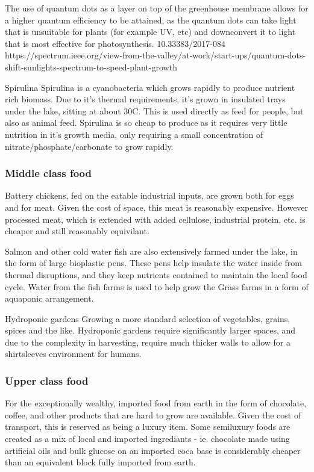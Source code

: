 \documentclass[10pt]{article}
\begin{document}
The use of quantum dots as a layer on top of the greenhouse membrane allows for a higher quantum efficiency to be attained, as the quantum dots can take light that is unsuitable for plants (for example UV, etc) and downconvert it to light that is most effective for photosynthesis. 10.33383/2017-084 
https://spectrum.ieee.org/view-from-the-valley/at-work/start-ups/quantum-dots-shift-sunlights-spectrum-to-speed-plant-growth


Spirulina
Spirulina is a cyanobacteria which grows rapidly to produce nutrient rich biomass. Due to it's thermal requirements, it's grown in insulated trays under the lake, sitting at about 30C. This is used directly as feed for people, but also as animal feed. Spirulina is so cheap to produce as it requires very little nutrition in it's growth media, only requiring a small concentration of nitrate/phosphate/carbonate to grow rapidly.

\subsubsection*{Middle class food}
Battery chickens, fed on the eatable industrial inputs, are grown both for eggs and for meat. Given the cost of space, this meat is reasonably expensive. However processed meat, which is extended with added cellulose, industrial protein, etc. is cheaper and still reasonably equivilant.

Salmon and other cold water fish are also extensively farmed under the lake, in the form of large bioplastic pens. These pens help insulate the water inside from thermal disruptions, and they keep nutrients contained to maintain the local food cycle. Water from the fish farms is used to help grow the Grass farms in a form of aquaponic arrangement.

Hydroponic gardens
Growing a more standard selection of vegetables, grains, spices and the like. Hydroponic gardens require significantly larger spaces, and due to the complexity in harvesting, require much thicker walls to allow for a shirtsleeves environment for humans.

\subsubsection*{Upper class food}
For the exceptionally wealthy, imported food from earth in the form of chocolate, coffee, and other products that are hard to grow are available. Given the cost of transport, this is reserved as being a luxury item. Some semiluxury foods are created as a mix of local and imported ingrediants - ie. chocolate made using artificial oils and bulk glucose on an imported coca base is considerably cheaper than an equivalent block fully imported from earth.
\end{document}
